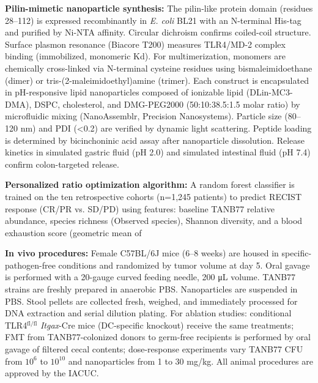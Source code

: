 \documentclass{article}
\begin{document}
\textbf{Pilin-mimetic nanoparticle synthesis:} The pilin-like protein domain (residues 28--112) is expressed recombinantly in \textit{E. coli} BL21 with an N-terminal His-tag and purified by Ni-NTA affinity. Circular dichroism confirms coiled-coil structure. Surface plasmon resonance (Biacore T200) measures TLR4/MD-2 complex binding (immobilized, monomeric Kd). For multimerization, monomers are chemically cross-linked via N-terminal cysteine residues using bismaleimidoethane (dimer) or tris-(2-maleimidoethyl)amine (trimer). Each construct is encapsulated in pH-responsive lipid nanoparticles composed of ionizable lipid (DLin-MC3-DMA), DSPC, cholesterol, and DMG-PEG2000 (50:10:38.5:1.5 molar ratio) by microfluidic mixing (NanoAssemblr, Precision Nanosystems). Particle size (80--120 nm) and PDI (<0.2) are verified by dynamic light scattering. Peptide loading is determined by bicinchoninic acid assay after nanoparticle dissolution. Release kinetics in simulated gastric fluid (pH 2.0) and simulated intestinal fluid (pH 7.4) confirm colon-targeted release.

\textbf{Personalized ratio optimization algorithm:} A random forest classifier is trained on the ten retrospective cohorts (n=1,245 patients) to predict RECIST response (CR/PR vs. SD/PD) using features: baseline TANB77 relative abundance, species richness (Observed species), Shannon diversity, and a blood exhaustion score (geometric mean of %

\textbf{In vivo procedures:} Female C57BL/6J mice (6--8 weeks) are housed in specific-pathogen-free conditions and randomized by tumor volume at day 5. Oral gavage is performed with a 20-gauge curved feeding needle, 200 μL volume. TANB77 strains are freshly prepared in anaerobic PBS. Nanoparticles are suspended in PBS. Stool pellets are collected fresh, weighed, and immediately processed for DNA extraction and serial dilution plating. For ablation studies: conditional TLR4$^{\text{fl/fl}}$ \textit{Itgax}-Cre mice (DC-specific knockout) receive the same treatments; FMT from TANB77-colonized donors to germ-free recipients is performed by oral gavage of filtered cecal contents; dose-response experiments vary TANB77 CFU from $10^6$ to $10^{10}$ and nanoparticles from 1 to 30 mg/kg. All animal procedures are approved by the IACUC.
\end{document}
